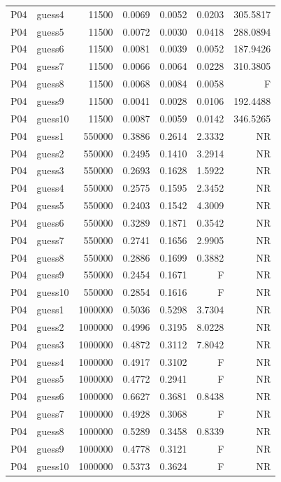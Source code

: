 {\begin{longtable}{llrrrrr}
P04 & guess4 & 11500 & 0.0069 & 0.0052 & 0.0203 & 305.5817 \\
P04 & guess5 & 11500 & 0.0072 & 0.0030 & 0.0418 & 288.0894 \\
P04 & guess6 & 11500 & 0.0081 & 0.0039 & 0.0052 & 187.9426 \\
P04 & guess7 & 11500 & 0.0066 & 0.0064 & 0.0228 & 310.3805 \\
P04 & guess8 & 11500 & 0.0068 & 0.0084 & 0.0058 & F \\
P04 & guess9 & 11500 & 0.0041 & 0.0028 & 0.0106 & 192.4488 \\
P04 & guess10 & 11500 & 0.0087 & 0.0059 & 0.0142 & 346.5265 \\
P04 & guess1 & 550000 & 0.3886 & 0.2614 & 2.3332 & NR \\
P04 & guess2 & 550000 & 0.2495 & 0.1410 & 3.2914 & NR \\
P04 & guess3 & 550000 & 0.2693 & 0.1628 & 1.5922 & NR \\
P04 & guess4 & 550000 & 0.2575 & 0.1595 & 2.3452 & NR \\
P04 & guess5 & 550000 & 0.2403 & 0.1542 & 4.3009 & NR \\
P04 & guess6 & 550000 & 0.3289 & 0.1871 & 0.3542 & NR \\
P04 & guess7 & 550000 & 0.2741 & 0.1656 & 2.9905 & NR \\
P04 & guess8 & 550000 & 0.2886 & 0.1699 & 0.3882 & NR \\
P04 & guess9 & 550000 & 0.2454 & 0.1671 & F & NR \\
P04 & guess10 & 550000 & 0.2854 & 0.1616 & F & NR \\
P04 & guess1 & 1000000 & 0.5036 & 0.5298 & 3.7304 & NR \\
P04 & guess2 & 1000000 & 0.4996 & 0.3195 & 8.0228 & NR \\
P04 & guess3 & 1000000 & 0.4872 & 0.3112 & 7.8042 & NR \\
P04 & guess4 & 1000000 & 0.4917 & 0.3102 & F & NR \\
P04 & guess5 & 1000000 & 0.4772 & 0.2941 & F & NR \\
P04 & guess6 & 1000000 & 0.6627 & 0.3681 & 0.8438 & NR \\
P04 & guess7 & 1000000 & 0.4928 & 0.3068 & F & NR \\
P04 & guess8 & 1000000 & 0.5289 & 0.3458 & 0.8339 & NR \\
P04 & guess9 & 1000000 & 0.4778 & 0.3121 & F & NR \\
P04 & guess10 & 1000000 & 0.5373 & 0.3624 & F & NR \\

\end{longtable}}
